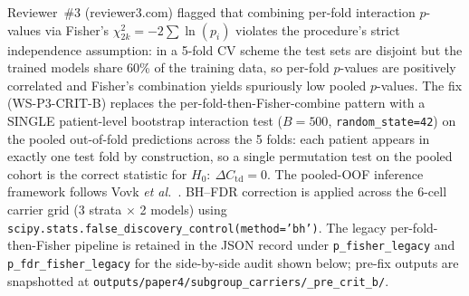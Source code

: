 \documentclass[11pt]{article}
\begin{document}
Reviewer~\#3 (reviewer3.com) flagged that combining per-fold interaction $p$-values via Fisher's $\chi^2_{2k} = -2\sum\ln(p_i)$ violates the procedure's strict independence assumption: in a 5-fold CV scheme the test sets are disjoint but the trained models share 60\% of the training data, so per-fold $p$-values are positively correlated and Fisher's combination yields spuriously low pooled $p$-values. The fix (WS-P3-CRIT-B) replaces the per-fold-then-Fisher-combine pattern with a SINGLE patient-level bootstrap interaction test ($B{=}500$, \texttt{random\_state=42}) on the pooled out-of-fold predictions across the 5 folds: each patient appears in exactly one test fold by construction, so a single permutation test on the pooled cohort is the correct statistic for $H_0:\ \Delta C_\mathrm{td} = 0$. The pooled-OOF inference framework follows Vovk \emph{et al.}~\cite{vovk2022conformal}. BH--FDR correction is applied across the 6-cell carrier grid (3 strata $\times$ 2 models) using \texttt{scipy.stats.false\_discovery\_control(method='bh')}. The legacy per-fold-then-Fisher pipeline is retained in the JSON record under \texttt{p\_fisher\_legacy} and \texttt{p\_fdr\_fisher\_legacy} for the side-by-side audit shown below; pre-fix outputs are snapshotted at \texttt{outputs/paper4/subgroup\_carriers/\_pre\_crit\_b/}.
\end{document}
